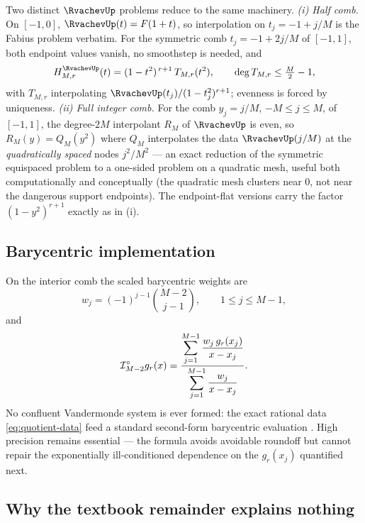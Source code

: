 \begin{remark}
\label{rem:up-versions}
Two distinct $\RvachevUp$ problems reduce to the same machinery.
\emph{(i) Half comb.}  On $[-1,0]$, $\RvachevUp(t)=F(1+t)$, so
interpolation on $t_j=-1+j/M$ is the Fabius problem verbatim.  For
the symmetric comb $t_j=-1+2j/M$ of $[-1,1]$, both endpoint values
vanish, no smoothstep is needed, and
\begin{equation}
 H^{\RvachevUp}_{M,r}(t)=(1-t^{2})^{\,r+1}\,T_{M,r}(t^{2}),
 \qquad
 \deg T_{M,r}\le \tfrac M2-1,
 \label{eq:up-factor}
\end{equation}
with $T_{M,r}$ interpolating
$\RvachevUp(t_j)/(1-t_j^{2})^{r+1}$; evenness is forced by uniqueness.
\emph{(ii) Full integer comb.}  For the comb $y_j=j/M$,
$-M\le j\le M$, of $[-1,1]$, the degree-$2M$ interpolant $R_M$ of
$\RvachevUp$ is even, so $R_M(y)=Q_M(y^{2})$ where $Q_M$ interpolates the
data $\RvachevUp(j/M)$ at the \emph{quadratically spaced} nodes
$j^{2}/M^{2}$ --- an exact reduction of the symmetric equispaced
problem to a one-sided problem on a quadratic mesh, useful both
computationally and conceptually (the quadratic mesh clusters near
$0$, not near the dangerous support endpoints).  The endpoint-flat
versions carry the factor $(1-y^{2})^{r+1}$ exactly as in (i).
\end{remark}

\subsection{Barycentric implementation}

On the interior comb the scaled barycentric weights are
\begin{equation}
 w_j=(-1)^{j-1}\binom{M-2}{j-1},
 \qquad 1\le j\le M-1,
 \label{eq:interior-weights}
\end{equation}
and
\begin{equation}
 \mathcal I^{\circ}_{M-2}g_r(x)
 =\frac{\displaystyle\sum_{j=1}^{M-1}\frac{w_j\,g_r(x_j)}{x-x_j}}
 {\displaystyle\sum_{j=1}^{M-1}\frac{w_j}{x-x_j}}.
 \label{eq:bary-interior}
\end{equation}
No confluent Vandermonde system is ever formed: the exact rational
data \eqref{eq:quotient-data} feed a standard second-form barycentric
evaluation \cite{BerrutTrefethen2004}.  High precision remains
essential --- the formula avoids avoidable roundoff but cannot repair
the exponentially ill-conditioned dependence on the $g_r(x_j)$
quantified next.

\subsection{Why the textbook remainder explains nothing}

